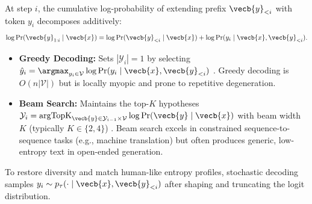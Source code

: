 \documentclass[../../../../master.tex]{subfiles}
\begin{document}
\begin{coremath}
At step $i$, the cumulative log-probability of extending prefix $\vecb{y}_{<i}$ with token $y_i$ decomposes additively:
\begin{equation}\label{eq:decode:cumulative_logprob}
  \log \Pr(\vecb{y}_{1:i} \mid \vecb{x}) = \log \Pr(\vecb{y}_{<i} \mid \vecb{x}) + \log \Pr(y_i \mid \vecb{x}, \vecb{y}_{<i}).
\end{equation}
\begin{itemize}
  \item \textbf{Greedy Decoding:} Sets $|\mathcal{Y}_i| = 1$ by selecting $\hat{y}_i = \argmax_{y_i \in \mathcal{V}} \log \Pr(y_i \mid \vecb{x}, \vecb{y}_{<i})$ . Greedy decoding is $O(n|\mathcal{V}|)$ but is locally myopic and prone to repetitive degeneration.
  \item \textbf{Beam Search:} Maintains the top-$K$ hypotheses $\mathcal{Y}_i = \mathrm{argTopK}_{\vecb{y} \in \mathcal{Y}_{i-1} \times \mathcal{V}} \log \Pr(\vecb{y} \mid \vecb{x})$ with beam width $K$ (typically $K \in \{2, 4\}$) . Beam search excels in constrained sequence-to-sequence tasks (e.g., machine translation) but often produces generic, low-entropy text in open-ended generation.
\end{itemize}
\end{coremath}

To restore diversity and match human-like entropy profiles, stochastic decoding samples $y_i \sim p_{\tau}(\cdot \mid \vecb{x}, \vecb{y}_{<i})$ after shaping and truncating the logit distribution.
\end{document}
